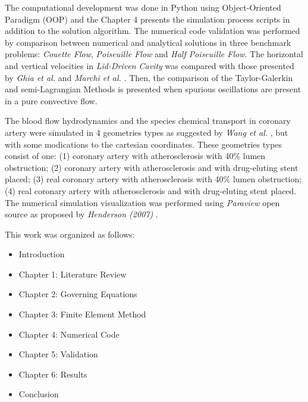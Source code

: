 \medskip
The computational development was done in Python \cite{python} using Object-Oriented Paradigm (OOP) and the Chapter 4 presents the simulation process scripts in addition to the solution algorithm.
The numerical code validation was performed by comparison between numerical and analytical solutions in three benchmark problems:
\textit{Couette Flow}, \textit{Poiseuille Flow} and \textit{Half Poiseuille Flow}. 
The horizontal and vertical velocities in \textit{Lid-Driven Cavity} was compared with those presented by \textit{Ghia et al.} \cite{ghia1982} and \textit{Marchi et al.} \cite{marchi2009}.
Then, the comparison of the Taylor-Galerkin and semi-Lagrangian Methods is presented when spurious oscillations are present in a pure convective flow.

\medskip
The blood flow hydrodynamics and the species chemical transport in coronary artery were simulated in 4 geometries types as suggested by \textit{Wang et al.} \cite{wang2017}, but with some modications to the cartesian coordinates.
These geometries types consist of one:
(1) coronary artery with atherosclerosis with 40\% lumen obstruction;
(2) coronary artery with atherosclerosis and with drug-eluting stent placed;
(3) real coronary artery with atherosclerosis with 40\% lumen obstruction;
(4) real coronary artery with atherosclerosis and with drug-eluting stent placed.
The numerical simulation visualization was performed using \textit{Paraview} open source as proposed by \textit{Henderson (2007)} \cite{paraview}.


\medskip
\noindent
This work was organized as follows:

\begin{itemize}
 \item Introduction\\[-1cm] 
 \item Chapter 1: Literature Review\\[-1cm]
 \item Chapter 2: Governing Equations\\[-1cm]
 \item Chapter 3: Finite Element Method\\[-1cm]
 \item Chapter 4: Numerical Code\\[-1cm]
 \item Chapter 5: Validation\\[-1cm]
 \item Chapter 6: Results\\[-1cm]
 \item Conclusion
\end{itemize}
